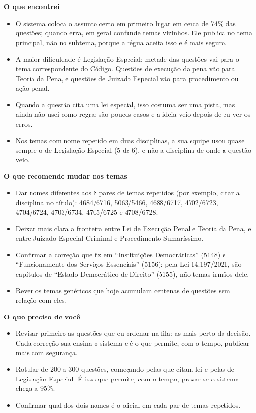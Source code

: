 \documentclass[11pt,a4paper]{article}
\newcommand{\bd}[1]{\textbf{#1}}
\begin{document}
\bd{O que encontrei}
\begin{itemize}
\item O sistema coloca o assunto certo em primeiro lugar em cerca de 74\% das questões; quando erra,
      em geral confunde temas vizinhos. Ele publica no tema principal, não no subtema, porque a
      régua aceita isso e é mais seguro.
\item A maior dificuldade é Legislação Especial: metade das questões vai para o tema
      correspondente do Código. Questões de execução da pena vão para Teoria da Pena, e questões de
      Juizado Especial vão para procedimento ou ação penal.
\item Quando a questão cita uma lei especial, isso costuma ser uma pista, mas ainda não usei como
      regra: são poucos casos e a ideia veio depois de eu ver os erros.
\item Nos temas com nome repetido em duas disciplinas, a sua equipe usou quase sempre o de
      Legislação Especial (5 de 6), e não a disciplina de onde a questão veio.
\end{itemize}

\bd{O que recomendo mudar nos temas}
\begin{itemize}
\item Dar nomes diferentes aos 8 pares de temas repetidos (por exemplo, citar a disciplina no
      título): 4684/6716, 5063/5466, 4688/6717, 4702/6723, 4704/6724, 4703/6734, 4705/6725 e
      4708/6728.
\item Deixar mais clara a fronteira entre Lei de Execução Penal e Teoria da Pena, e entre Juizado
      Especial Criminal e Procedimento Sumaríssimo.
\item Confirmar a correção que fiz em ``Instituições Democráticas'' (5148) e ``Funcionamento dos
      Serviços Essenciais'' (5156): pela Lei 14.197/2021, são capítulos de ``Estado Democrático de
      Direito'' (5155), não temas irmãos dele.
\item Rever os temas genéricos que hoje acumulam centenas de questões sem relação com eles.
\end{itemize}

\bd{O que preciso de você}
\begin{itemize}
\item Revisar primeiro as questões que eu ordenar na fila: as mais perto da decisão. Cada correção
      sua ensina o sistema e é o que permite, com o tempo, publicar mais com segurança.
\item Rotular de 200 a 300 questões, começando pelas que citam lei e pelas de Legislação Especial.
      É isso que permite, com o tempo, provar se o sistema chega a 95\%.
\item Confirmar qual dos dois nomes é o oficial em cada par de temas repetidos.
\end{itemize}
\end{document}
